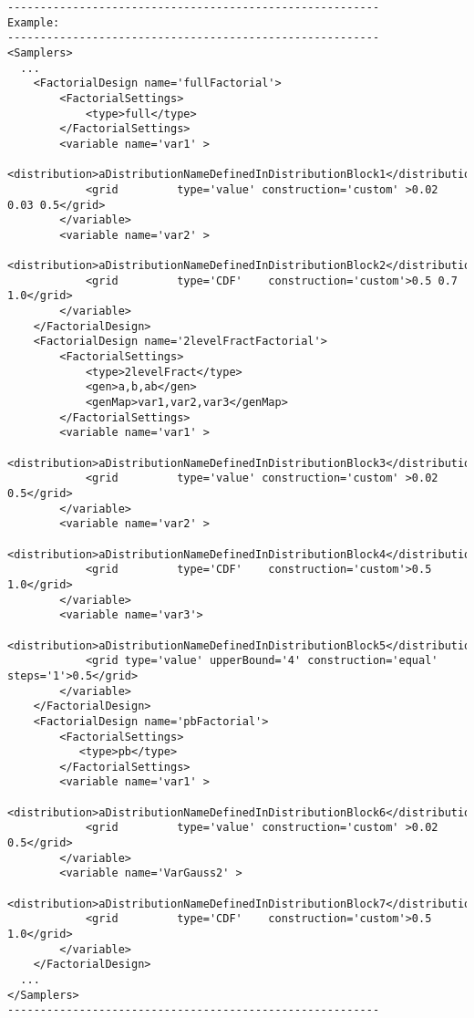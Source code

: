 \begin{lstlisting}[style=XML]
---------------------------------------------------------
Example:
---------------------------------------------------------
<Samplers>
  ...
    <FactorialDesign name='fullFactorial'>
        <FactorialSettings>
            <type>full</type>
        </FactorialSettings>
        <variable name='var1' >
            <distribution>aDistributionNameDefinedInDistributionBlock1</distribution> 
            <grid         type='value' construction='custom' >0.02 0.03 0.5</grid>
        </variable>
        <variable name='var2' >
            <distribution>aDistributionNameDefinedInDistributionBlock2</distribution> 
            <grid         type='CDF'    construction='custom'>0.5 0.7 1.0</grid>
        </variable>
    </FactorialDesign>
    <FactorialDesign name='2levelFractFactorial'>
        <FactorialSettings>
            <type>2levelFract</type>
            <gen>a,b,ab</gen>
            <genMap>var1,var2,var3</genMap>
        </FactorialSettings>
        <variable name='var1' >
            <distribution>aDistributionNameDefinedInDistributionBlock3</distribution> 
            <grid         type='value' construction='custom' >0.02 0.5</grid>
        </variable>
        <variable name='var2' >
            <distribution>aDistributionNameDefinedInDistributionBlock4</distribution> 
            <grid         type='CDF'    construction='custom'>0.5 1.0</grid>
        </variable>
        <variable name='var3'>
            <distribution>aDistributionNameDefinedInDistributionBlock5</distribution> 
            <grid type='value' upperBound='4' construction='equal' steps='1'>0.5</grid>
        </variable>
    </FactorialDesign>
    <FactorialDesign name='pbFactorial'>
        <FactorialSettings>
           <type>pb</type>
        </FactorialSettings>
        <variable name='var1' >
            <distribution>aDistributionNameDefinedInDistributionBlock6</distribution> 
            <grid         type='value' construction='custom' >0.02 0.5</grid>
        </variable>
        <variable name='VarGauss2' >
            <distribution>aDistributionNameDefinedInDistributionBlock7</distribution> 
            <grid         type='CDF'    construction='custom'>0.5 1.0</grid>
        </variable>
    </FactorialDesign>
  ...
</Samplers>
---------------------------------------------------------
\end{lstlisting}


